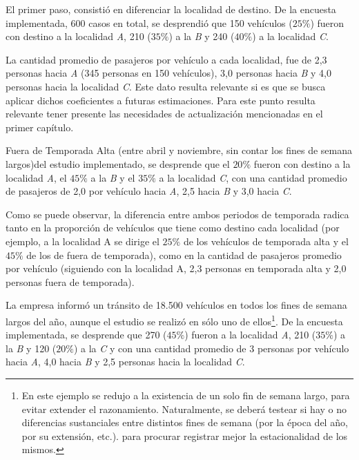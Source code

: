 \documentclass[
]{book}
\begin{document}
El primer paso, consistió en diferenciar la localidad de destino. De la encuesta implementada, 600 casos en total, se desprendió que 150 vehículos (\(25\%\)) fueron con destino a la localidad \emph{A}, 210 (\(35\%\)) a la \emph{B} y 240 (\(40\%\)) a la localidad \emph{C}.

La cantidad promedio de pasajeros por vehículo a cada localidad, fue de 2,3 personas hacia \emph{A} (345 personas en 150 vehículos), 3,0 personas hacia \emph{B} y 4,0 personas hacia la localidad \emph{C}. Este dato resulta relevante si es que se busca aplicar dichos coeficientes a futuras estimaciones. Para este punto resulta relevante tener presente las necesidades de actualización mencionadas en el primer capítulo.

Fuera de Temporada Alta (entre abril y noviembre, sin contar los fines de semana largos)del estudio implementado, se desprende que el \(20\%\) fueron con destino a la localidad \emph{A}, el \(45\%\) a la \emph{B} y el \(35\%\) a la localidad \emph{C}, con una cantidad promedio de pasajeros de 2,0 por vehículo hacia \emph{A}, 2,5 hacia \emph{B} y 3,0 hacia \emph{C}.

Como se puede observar, la diferencia entre ambos periodos de temporada radica tanto en la proporción de vehículos que tiene como destino cada localidad (por ejemplo, a la localidad A se dirige el \(25\%\) de los vehículos de temporada alta y el \(45\%\) de los de fuera de temporada), como en la cantidad de pasajeros promedio por vehículo (siguiendo con la localidad A, 2,3 personas en temporada alta y 2,0 personas fuera de temporada).

La empresa informó un tránsito de 18.500 vehículos en todos los fines de semana largos del año, aunque el estudio se realizó en sólo uno de ellos\footnote{En este ejemplo se redujo a la existencia de un solo fin de semana largo, para evitar extender el razonamiento. Naturalmente, se deberá testear si hay o no diferencias sustanciales entre distintos fines de semana (por la época del año, por su extensión, etc.). para procurar registrar mejor la estacionalidad de los mismos.}. De la encuesta implementada, se desprende que 270 (\(45\%\)) fueron a la localidad \emph{A}, 210 (\(35\%\)) a la \emph{B} y 120 (\(20\%\)) a la \emph{C} y con una cantidad promedio de 3 personas por vehículo hacia \emph{A}, 4,0 hacia \emph{B} y 2,5 personas hacia la localidad \emph{C}.
\end{document}
